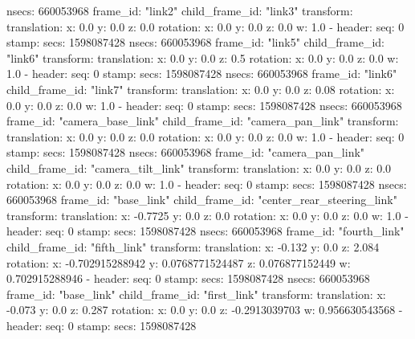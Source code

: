         nsecs: 660053968
      frame_id: "link2"
    child_frame_id: "link3"
    transform: 
      translation: 
        x: 0.0
        y: 0.0
        z: 0.0
      rotation: 
        x: 0.0
        y: 0.0
        z: 0.0
        w: 1.0
  - 
    header: 
      seq: 0
      stamp: 
        secs: 1598087428
        nsecs: 660053968
      frame_id: "link5"
    child_frame_id: "link6"
    transform: 
      translation: 
        x: 0.0
        y: 0.0
        z: 0.5
      rotation: 
        x: 0.0
        y: 0.0
        z: 0.0
        w: 1.0
  - 
    header: 
      seq: 0
      stamp: 
        secs: 1598087428
        nsecs: 660053968
      frame_id: "link6"
    child_frame_id: "link7"
    transform: 
      translation: 
        x: 0.0
        y: 0.0
        z: 0.08
      rotation: 
        x: 0.0
        y: 0.0
        z: 0.0
        w: 1.0
  - 
    header: 
      seq: 0
      stamp: 
        secs: 1598087428
        nsecs: 660053968
      frame_id: "camera_base_link"
    child_frame_id: "camera_pan_link"
    transform: 
      translation: 
        x: 0.0
        y: 0.0
        z: 0.0
      rotation: 
        x: 0.0
        y: 0.0
        z: 0.0
        w: 1.0
  - 
    header: 
      seq: 0
      stamp: 
        secs: 1598087428
        nsecs: 660053968
      frame_id: "camera_pan_link"
    child_frame_id: "camera_tilt_link"
    transform: 
      translation: 
        x: 0.0
        y: 0.0
        z: 0.0
      rotation: 
        x: 0.0
        y: 0.0
        z: 0.0
        w: 1.0
  - 
    header: 
      seq: 0
      stamp: 
        secs: 1598087428
        nsecs: 660053968
      frame_id: "base_link"
    child_frame_id: "center_rear_steering_link"
    transform: 
      translation: 
        x: -0.7725
        y: 0.0
        z: 0.0
      rotation: 
        x: 0.0
        y: 0.0
        z: 0.0
        w: 1.0
  - 
    header: 
      seq: 0
      stamp: 
        secs: 1598087428
        nsecs: 660053968
      frame_id: "fourth_link"
    child_frame_id: "fifth_link"
    transform: 
      translation: 
        x: -0.132
        y: 0.0
        z: 2.084
      rotation: 
        x: -0.702915288942
        y: 0.0768771524487
        z: 0.076877152449
        w: 0.702915288946
  - 
    header: 
      seq: 0
      stamp: 
        secs: 1598087428
        nsecs: 660053968
      frame_id: "base_link"
    child_frame_id: "first_link"
    transform: 
      translation: 
        x: -0.073
        y: 0.0
        z: 0.287
      rotation: 
        x: 0.0
        y: 0.0
        z: -0.2913039703
        w: 0.956630543568
  - 
    header: 
      seq: 0
      stamp: 
        secs: 1598087428
